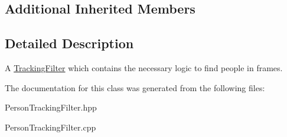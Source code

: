 \subsection*{Additional Inherited Members}


\subsection{Detailed Description}
A \hyperlink{classTrackingFilter}{Tracking\+Filter} which contains the necessary logic to find people in frames. 

The documentation for this class was generated from the following files\+:\begin{DoxyCompactItemize}
\item 
Person\+Tracking\+Filter.\+hpp\item 
Person\+Tracking\+Filter.\+cpp\end{DoxyCompactItemize}
